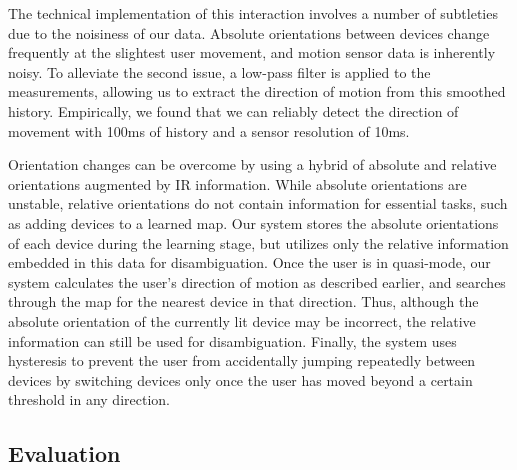 The technical implementation of this interaction involves a number of subtleties due to the noisiness of our data. Absolute orientations between devices change frequently at the slightest user movement, and motion sensor data is inherently noisy. To alleviate the second issue, a low-pass filter is applied to the measurements, allowing us to extract the direction of motion from this smoothed history. Empirically, we found that we can reliably detect the direction of movement with 100ms of history and a sensor resolution of 10ms.

Orientation changes can be overcome by using a hybrid of absolute and relative orientations augmented by IR information. While absolute orientations are unstable, relative orientations do not contain information for essential tasks, such as adding devices to a learned map. Our system stores the absolute orientations of each device during the learning stage, but utilizes only the relative information embedded in this data for disambiguation. Once the user is in quasi-mode, our system calculates the user's direction of motion as described earlier, and searches through the map for the nearest device in that direction. Thus, although the absolute orientation of the currently lit device may be incorrect, the relative information can still be used for disambiguation. Finally, the system uses hysteresis to prevent the user from accidentally jumping repeatedly between devices by switching devices only once the user has moved beyond a certain threshold in any direction. 



\subsection{Evaluation}




